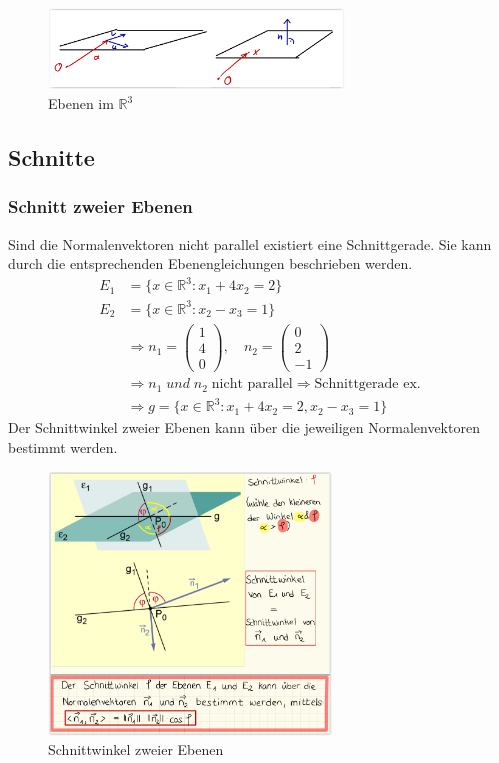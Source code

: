\documentclass[12pt,a4paper]{report}%
\numberwithin{equation}{section}
\newcommand{\R}{\mathbb{R}} %
\def\vecT#1{\left(\begin{array}{c} #1 \end{array}\right)}
\numberwithin{equation}{subsection}
\begin{document}
    \begin{figure}[htbp] 
		  \centering
		  \includegraphics[width=0.7\textwidth]{Ebene_R3.png}
		  \caption{Ebenen im $\R^3$\protect\cite{HM12}}
		  \label{fig:ebene_R3}
	  \end{figure}
	  
	\subsection{Schnitte}
	  \subsubsection{Schnitt zweier Ebenen}
	  Sind die Normalenvektoren nicht parallel existiert eine Schnittgerade. Sie kann durch die entsprechenden Ebenengleichungen beschrieben werden.
	  \begin{align*}
	    E_1 &= \lbrace x\in \R^3:x_1 + 4x_2 = 2 \rbrace \\
	    E_2 &= \lbrace x \in \R^3: x_2 - x_3 = 1\rbrace \\
	    &\Rightarrow n_1 = \vecT{1\\4\\0},\quad n_2 = \vecT{0\\2\\-1} \\ 
	    &\Rightarrow n_1 \; und \; n_2 \;\text{nicht parallel} \Rightarrow \text{Schnittgerade ex.}\\
	    &\Rightarrow g=\lbrace x\in \R^3: x_1 + 4x_2 = 2, x_2 - x_3 = 1\rbrace
	  \end{align*}
	  Der Schnittwinkel zweier Ebenen kann über die jeweiligen Normalenvektoren bestimmt werden.
	  \begin{figure}[htbp] 
		  \centering
		  \includegraphics[width=0.67\textwidth]{schnitt_ebene.png}
		  \caption{Schnittwinkel zweier Ebenen\protect\cite{HM1Vortragsubung}}
		  \label{fig:ebene_schnittwinkel}
	  \end{figure} 
	  
\end{document}
